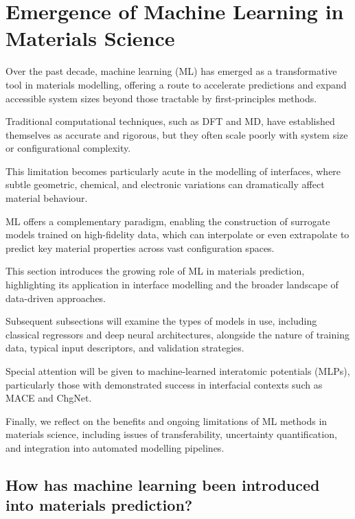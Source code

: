 \section{Emergence of Machine Learning in Materials Science} \label{section:machine_learning}


Over the past decade, machine learning (ML) has emerged as a transformative tool in materials modelling, offering a
route to accelerate predictions and expand accessible system sizes beyond those tractable by first-principles methods.

Traditional computational techniques, such as DFT and MD, have established themselves as accurate and rigorous, but they
often scale poorly with system size or configurational complexity.

This limitation becomes particularly acute in the modelling of interfaces, where subtle geometric, chemical, and
electronic variations can dramatically affect material behaviour.

ML offers a complementary paradigm, enabling the construction of surrogate models trained on high-fidelity data, which
can interpolate or even extrapolate to predict key material properties across vast configuration spaces.


This section introduces the growing role of ML in materials prediction, highlighting its application in interface
modelling and the broader landscape of data-driven approaches.

Subsequent subsections will examine the types of models in use, including classical regressors and deep neural
architectures, alongside the nature of training data, typical input descriptors, and validation strategies.

Special attention will be given to machine-learned interatomic potentials (MLPs), particularly those with demonstrated
success in interfacial contexts such as MACE and ChgNet.

Finally, we reflect on the benefits and ongoing limitations of ML methods in materials science, including issues of
transferability, uncertainty quantification, and integration into automated modelling pipelines.


\subsection{How has machine learning been introduced into materials prediction?}

